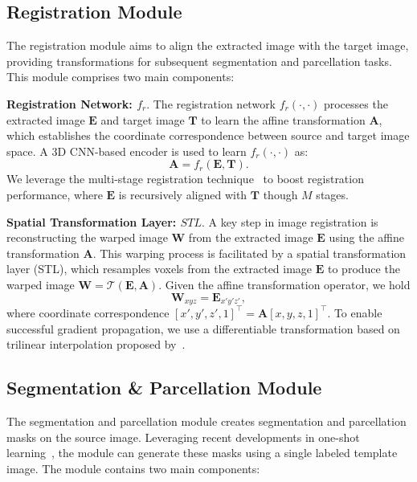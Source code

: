 \vspace{-3pt}
\subsection{Registration Module}
\label{sec: registration Module}
The registration module aims to align the extracted image with the target image, providing transformations for subsequent segmentation and parcellation tasks. This module comprises two main components:

\vspace{1pt}
\noindent \textbf{Registration Network: $f_{r}$}.
The registration network $f_{r}(\cdot, \cdot)$ processes the extracted image $ \mathbf{E}$ and target image $\mathbf{T}$ to learn the affine transformation $\mathbf{A}$, which establishes the coordinate correspondence between source and target image space. A 3D CNN-based encoder is used to learn $f_{r}(\cdot, \cdot)$ as:
\begin{equation}
\mathbf{A}=f_{r}\left(\mathbf{E}, \mathbf{T}\right).
\end{equation}
We leverage the multi-stage registration technique~\cite{su2022abn,zhao2019recursive} to boost registration performance, where $\mathbf{E}$ is recursively aligned with $\mathbf{T}$ though $M$ stages. 

\vspace{1pt}
\noindent \textbf{Spatial Transformation Layer: $STL$}.
A key step in image registration is reconstructing the warped image $\mathbf{W}$ from the extracted image $\mathbf{E}$ using the affine transformation $\mathbf{A}$. This warping process is facilitated by a spatial transformation layer (STL), which resamples voxels from the extracted
image $\mathbf{E}$ to produce the warped image $\mathbf{W} = \mathcal{T}(\mathbf{E}, \mathbf{A})$. Given the affine transformation operator, we hold
\begin{equation}
     \mathbf{W}_{xyz} = \mathbf{E}_{x'y'z'} \hspace{1pt},
     \label{equ:voxel_value_k}
\end{equation}
where coordinate correspondence $[x', y', z', 1]^\top = \mathbf{A}[x, y, z, 1]^\top $. 
To enable successful gradient propagation, we use a differentiable transformation based on trilinear interpolation proposed by~\cite{jaderberg2015spatial}.

\vspace{-3pt}
\subsection{Segmentation \& Parcellation Module}
The segmentation and parcellation module creates segmentation and parcellation masks on the source image.
Leveraging recent developments in one-shot learning~\cite{wang2020lt, ding2021modeling, su2023one}, the module can generate these masks using a single labeled template image. The module contains two main components:

